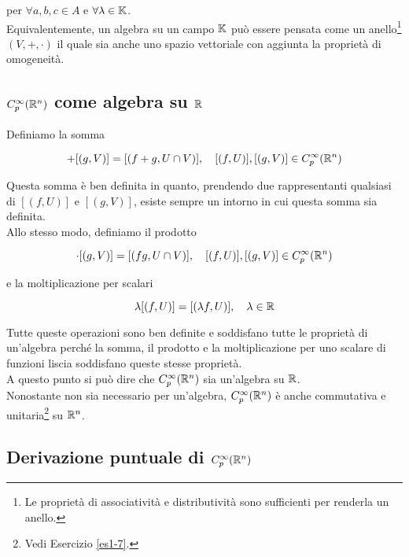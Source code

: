 per $ \forall a,b,c \in A $ e $ \forall \lambda \in \mathbb{K} $.\\
Equivalentemente, un algebra su un campo $ \mathbb{K} $ può essere pensata come un anello\footnote{%
	Le proprietà di associatività e distributività sono sufficienti per renderla un anello.%
} $ (V,+,\cdot) $ il quale sia anche uno spazio vettoriale con aggiunta la proprietà di omogeneità.

\subsection{$ C_{p}^{\infty}(\mathbb{R}^{n}) $ come algebra su $ \mathbb{R} $}

Definiamo la somma

\begin{equation}
	[(f,U)] + [(g,V)] = [(f + g,U \cap V)] \qcomma [(f,U)], [(g,V)] \in C_{p}^{\infty}(\R^{n})
\end{equation}

Questa somma è ben definita in quanto, prendendo due rappresentanti qualsiasi di $ [(f,U)] $ e $ [(g,V)] $, esiste sempre un intorno in cui questa somma sia definita.\\
Allo stesso modo, definiamo il prodotto

\begin{equation}
	[(f,U)] \cdot [(g,V)] = [(f g,U \cap V)] \qcomma [(f,U)], [(g,V)] \in C_{p}^{\infty}(\R^{n})
\end{equation}

e la moltiplicazione per scalari

\begin{equation}
	\lambda [(f,U)] = [(\lambda f,U)] \qcomma \lambda \in \R
\end{equation}

Tutte queste operazioni sono ben definite e soddisfano tutte le proprietà di un'algebra perché la somma, il prodotto e la moltiplicazione per uno scalare di funzioni liscia soddisfano queste stesse proprietà.\\
A questo punto si può dire che $ C_{p}^{\infty}(\mathbb{R}^{n}) $ sia un'algebra su $ \mathbb{R} $.\\
Nonostante non sia necessario per un'algebra, $ C_{p}^{\infty}(\mathbb{R}^{n}) $ è anche commutativa e unitaria\footnote{%
	Vedi Esercizio \ref{es1-7}.%
} su $ \mathbb{R}^{n} $.

\subsection{Derivazione puntuale di $ C_{p}^{\infty}(\mathbb{R}^{n}) $}

